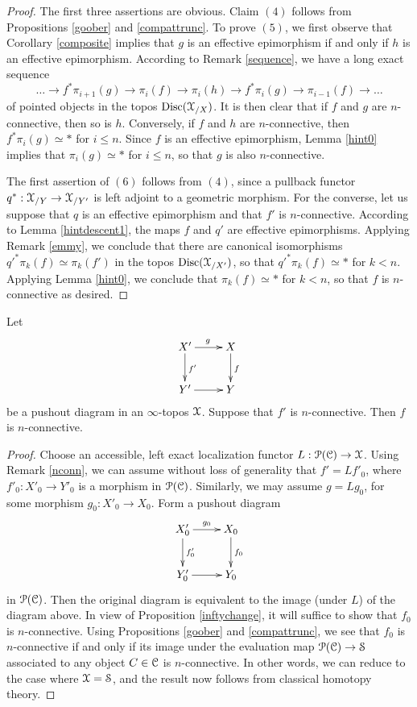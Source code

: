\begin{proof}
The first three assertions are obvious. Claim $(4)$ follows from Propositions \ref{goober} and \ref{compattrunc}. To prove $(5)$, we first observe that Corollary \ref{composite} implies that
$g$ is an effective epimorphism if and only if $h$ is an effective epimorphism. According to
Remark \ref{sequence}, we have a long exact sequence
$$\ldots \rightarrow f^{\ast} \pi_{i+1}(g) {\rightarrow} \pi_i(f) \rightarrow \pi_i(h) \rightarrow f^{\ast}
\pi_i(g) \rightarrow \pi_{i-1}(f) \rightarrow \ldots$$ 
of pointed objects in the topos $\operatorname{Disc}(\operatorname{\mathcal{X}}_{/X})$. It is then clear that if $f$ and $g$
are $n$-connective, then so is $h$. Conversely, if $f$ and $h$ are $n$-connective, then
$f^{\ast} \pi_i(g) \simeq \ast$ for $i \leq n$. Since $f$ is an effective epimorphism, Lemma \ref{hint0} implies that $\pi_i(g) \simeq \ast$ for $i \leq n$, so that $g$ is also $n$-connective.

The first assertion of $(6)$ follows from $(4)$, since a pullback functor
$q^{\ast}: \operatorname{\mathcal{X}}_{/Y} \rightarrow \operatorname{\mathcal{X}}_{/Y'}$ is left adjoint to a geometric morphism.
For the converse, let us suppose that $q$ is an effective epimorphism and that $f'$ is $n$-connective. According to Lemma \ref{hintdescent1}, the maps $f$ and $q'$ are effective epimorphisms. Applying Remark \ref{emmy}, we conclude that there are canonical isomorphisms
${q'}^{\ast} \pi_k(f) \simeq \pi_k(f')$ in the topos $\operatorname{Disc}( \operatorname{\mathcal{X}}_{/X'})$, so that
${q'}^{\ast} \pi_k(f) \simeq \ast$ for $k < n$. Applying Lemma \ref{hint0}, we conclude
that $\pi_k(f) \simeq \ast$ for  $k < n$, so that $f$ is $n$-connective as desired.
\end{proof}

\begin{corollary}\label{pusherr}
Let 
$$\xymatrix{ X' \ar[r]^{g} \ar[d]^{f'} & X \ar[d]^{f} \\
Y' \ar[r] & Y }$$
be a pushout diagram in an $\infty$-topos $\operatorname{\mathcal{X}}$. Suppose that $f'$ is
$n$-connective. Then $f$ is $n$-connective.
\end{corollary}

\begin{proof}
Choose an accessible, left exact localization functor $L: \operatorname{\mathcal{P}}(\operatorname{\mathcal{C}}) \rightarrow \operatorname{\mathcal{X}}$.
Using Remark \ref{nconn}, we can assume without loss of generality that
$f' = Lf'_0$, where $f'_0: X'_0 \rightarrow Y'_0$ is a morphism in $\operatorname{\mathcal{P}}(\operatorname{\mathcal{C}})$.
Similarly, we may assume $g = Lg_0$, for some morphism $g_0: X'_0 \rightarrow X_0$.
Form a pushout diagram
$$\xymatrix{ X'_0 \ar[r]^{g_0} \ar[d]^{f'_0} & X_0 \ar[d]^{f_0} \\
Y'_0 \ar[r] & Y_0 }$$
in $\operatorname{\mathcal{P}}(\operatorname{\mathcal{C}})$. Then the original diagram is equivalent to the image (under $L$) of the diagram above. In view of Proposition \ref{inftychange}, it will suffice to show that $f_0$ is $n$-connective.
Using Propositions \ref{goober} and \ref{compattrunc}, we see that $f_0$ is $n$-connective if and only if its image under the evaluation map $\operatorname{\mathcal{P}}(\operatorname{\mathcal{C}}) \rightarrow \operatorname{\mathcal{S}}$ associated to any object $C \in \operatorname{\mathcal{C}}$ is $n$-connective. In other words, we can reduce to the case where $\operatorname{\mathcal{X}} = \operatorname{\mathcal{S}}$, and the result now follows from classical homotopy theory.
\end{proof}

